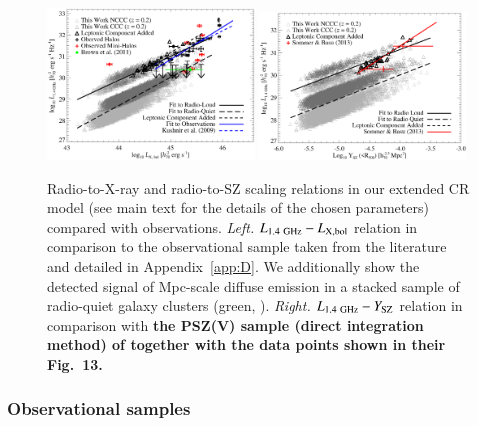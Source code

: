 \documentclass[useAMS,usenatbib]{mn2e}
\begin{document}
\begin{figure} 
\centering
\includegraphics[width=0.49\textwidth]{figures/PL_relation.eps}
\includegraphics[width=0.49\textwidth]{figures/PSZ_relation.eps}
\caption{Radio-to-X-ray and radio-to-SZ scaling relations in our extended CR model
  (see main text for the details of the chosen parameters) compared with
  observations.  \emph{Left.} $L_{1.4~{\mathrm{GHz}}}-L_{{\mathrm{X,bol}}}$ relation in
  comparison to the observational sample taken from the literature and detailed
  in Appendix~\ref{app:D}. We additionally show the detected signal of Mpc-scale 
  diffuse emission in a stacked sample of radio-quiet galaxy clusters 
  (green, \protect\citealp{2011ApJ...740L..28B}). 
  \emph{Right.} $L_{1.4~{\mathrm{GHz}}}-Y_{{\mathrm{SZ}}}$ relation 
  in comparison with
  {\bf the PSZ(V) sample (direct integration method) 
  of \protect\cite{2013arXiv1307.3049S}
  together with the data points shown in their Fig.~13.}}
\label{fig:PLSZ}
\end{figure} 

\subsubsection{Observational samples}
\end{document}
